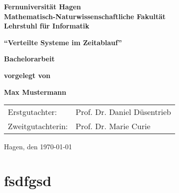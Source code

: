 \documentclass[12pt,ngerman,parskip=half]{scrbook}
\begin{document}
\begin{titlepage}
{\large\bfseries Fernuniversität Hagen \\
Mathematisch-Naturwissenschaftliche Fakultät \\
Lehrstuhl für Informatik}

\vspace*{5cm}
\begin{center}
{\LARGE\bfseries\enquote{Verteilte Systeme im Zeitablauf}}
\end{center}

\vspace*{1cm}
\begin{center}
{\Large\bfseries Bachelorarbeit}
\end{center}


\begin{center}
{\large\bfseries  vorgelegt von }
\end{center}

\begin{center}
{\Large\bfseries Max Mustermann}
\end{center}


\vfill
\begin{tabular}{ll}
Erstgutachter: & Prof. Dr. Daniel Düsentrieb \\
Zweitgutachterin: & Prof. Dr. Marie Curie \\
\end{tabular}

\hfill Hagen, den \today
\end{titlepage}



\tableofcontents

\listoffigures

\chapter{fsdfgsd}

\cite{knuth:1984}







\printbibliography
\end{document}
